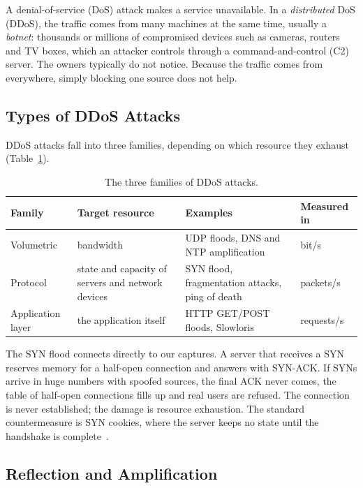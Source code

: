 A denial-of-service (DoS) attack makes a service unavailable. In a \emph{distributed} DoS (DDoS), the traffic comes from many machines at the same time, usually a \emph{botnet}: thousands or millions of compromised devices such as cameras, routers and TV boxes, which an attacker controls through a command-and-control (C2) server. The owners typically do not notice. Because the traffic comes from everywhere, simply blocking one source does not help.

\subsection{Types of DDoS Attacks}

DDoS attacks fall into three families, depending on which resource they exhaust (Table~\ref{tab:ddostypes}).

\begin{table}[ht]
	\centering
	\small
	\begin{tabularx}{\textwidth}{@{}l>{\raggedright\arraybackslash}p{3.4cm}>{\raggedright\arraybackslash}X>{\raggedright\arraybackslash}p{2.6cm}@{}}
		\toprule
		Family & Target resource & Examples & Measured in \\
		\midrule
		Volumetric & bandwidth & UDP floods, DNS and NTP amplification & bit/s \\
		Protocol & state and capacity of servers and network devices & SYN flood, fragmentation attacks, ping of death & packets/s \\
		Application layer & the application itself & HTTP GET/POST floods, Slowloris & requests/s \\
		\bottomrule
	\end{tabularx}
	\caption{The three families of DDoS attacks.}
	\label{tab:ddostypes}
\end{table}

The SYN flood connects directly to our captures. A server that receives a SYN reserves memory for a half-open connection and answers with SYN-ACK. If SYNs arrive in huge numbers with spoofed sources, the final ACK never comes, the table of half-open connections fills up and real users are refused. The connection is never established; the damage is resource exhaustion. The standard countermeasure is SYN cookies, where the server keeps no state until the handshake is complete~\cite{rfc4987}.

\subsection{Reflection and Amplification}

